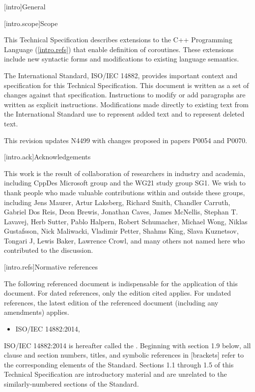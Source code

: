 
[intro]{General}

[intro.scope]{Scope}

\pnum
This Technical Specification describes extensions to the C++ 
Programming Language (\ref{intro.refs}) that
enable definition of coroutines. These extensions include 
new syntactic forms and modifications to existing language semantics.

\pnum
The International Standard, ISO/IEC 14882, provides important context
and specification for this Technical Specification. This document is 
written as a set of changes against that specification. Instructions
to modify or add paragraphs are written as explicit instructions. 
Modifications made directly to existing text from the International
Standard use  to represent added text and
 to represent deleted text.

\pnum
This revision updates N4499 with changes proposed in papers P0054 and P0070.

[intro.ack]{Acknowledgements}

This work is the result of collaboration of researchers in industry and academia, including CppDes Microsoft group and the WG21 study group SG1. We wish to thank people who made valuable contributions within and outside these groups, including Jens Maurer, Artur Laksberg, Richard Smith, Chandler Carruth, Gabriel Dos Reis, Deon Brewis, Jonathan Caves, James McNellis, Stephan T. Lavavej, Herb Sutter, Pablo Halpern, Robert Schumacher, Michael Wong, Niklas Gustafsson, Nick Maliwacki, Vladimir Petter, Shahms King, Slava Kuznetsov, Tongari J, Lewis Baker, Lawrence Crowl, and many others not named here who contributed to
the discussion.

[intro.refs]{Normative references}

\pnum
The following referenced document is indispensable for the
application of this document. For dated references, only the
edition cited applies. For undated references, the latest edition
of the referenced document (including any amendments) applies.

\begin{itemize}
\item ISO/IEC 14882:2014, 
\end{itemize}

ISO/IEC 14882:2014 is hereafter called the .
%
Beginning with section 1.9 below, all clause and section numbers, titles,
and symbolic references in [brackets] refer to the corresponding elements of the \Cpp Standard. Sections 1.1 through 1.5 of this Technical
Specification are introductory material and are unrelated to the similarly-numbered sections of the \Cpp Standard.

